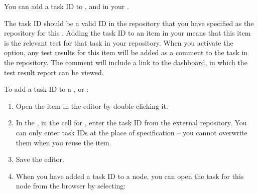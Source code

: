 You can add a task ID to \gdcases{}, \gdsuites{} and \gdjobs{} in your \gdproject{}. 

The task ID should be a valid ID in the repository that you have specified as the repository for this \gdproject{} . Adding the task ID to an item in your \gdproject{} means that this item is the relevant test for that task in your repository. When you activate the option, any test results for this item will be added as a comment to the task in the repository. The comment will include a link to the dashboard, in which the test result report can be viewed.

To add a task ID to a \gdcase{}, \gdsuite{} or \gdjob{}:
\begin{enumerate}
\item Open the item in the editor by double-clicking it.
\item In the \gdpropview{}, in the cell for , enter the task ID from the external repository. You can only enter task IDs at the place of specification -- you cannot overwrite them when you reuse the item.
\item Save the editor. 
\item When you have added a task ID to a node, you can open the task for this node from the browser by selecting:\\
\end{enumerate}

